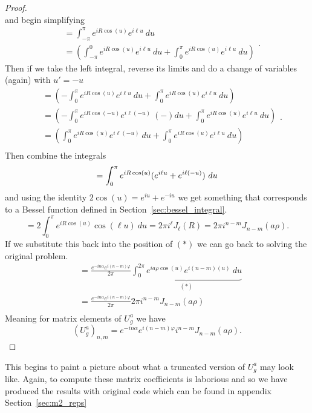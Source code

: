 \documentclass{article}
\begin{document}
\begin{proof}
\[    \]%
    and begin simplifying
    \[%
        \begin{split}
            &= \int^{\pi}_{-\pi} e^{iR\cos\left(u\right)}e^{i\ell u} \ du \\
            &= \left( \int^{0}_{-\pi} e^{iR\cos\left(u\right)}e^{i\ell u} \ du + \int^{\pi}_{0} e^{iR\cos\left(u\right)}e^{i\ell u} \ du \right)
        \end{split} 
    .\]%
    Then if we take the left integral, reverse its limits and do a change of variables (again) with $u' = -u$
    \[%
        \begin{split}
            &= \left( -\int^{\pi}_{0} e^{iR\cos\left(u\right)}e^{i\ell u} \ du + \int^{\pi}_{0} e^{iR\cos\left(u\right)}e^{i\ell u} \ du \right) \\
            &= \left( -\int^{\pi}_{0} e^{iR\cos\left(-u\right)}e^{i\ell(-u)} \ (-)du + \int^{\pi}_{0} e^{iR\cos\left(u\right)}e^{i\ell u} \ du \right) \\
            &=  \left( \int^{\pi}_{0} e^{iR\cos\left(u\right)}e^{i\ell(-u)} \ du + \int^{\pi}_{0} e^{iR\cos\left(u\right)}e^{i\ell u} \ du \right) \\
        \end{split}
    .\]%
    Then combine the integrals
    \[%
        = \int^{\pi}_{0} e^{iR\cos\left(u\right)} (e^{i\ell u} + e^{i\ell(-u)}) \ du  \\
    \]%
    and using the identity $2 \cos\left(u\right) = e^{iu} + e^{-iu}$ we get something that corresponds to a Bessel function defined in Section~\ref{sec:bessel_integral}.
    \[%
        = 2\int^{\pi}_{0} e^{iR\cos\left(u\right)}  \cos\left(\ell u\right) \ du = 2\pi i^{\ell} J_{\ell}(R) = 2\pi i^{n-m} J_{n-m}(a\rho)
    .\]%
    If we substitute this back into the position of $(*)$ we can go back to solving the original problem.
    \[%
        \begin{split}
            &= \frac{e^{-in\alpha} e^{i(n-m)\varphi}}{2\pi} \underbrace{\int^{2\pi}_{0} e^{ia\rho \cos\left(u\right)}e^{i (n-m)(u)} \ du}_{(*)} \\
            & = \frac{e^{-in\alpha} e^{i(n-m)\varphi}}{2\pi} 2\pi i^{n-m} J_{n-m}(a\rho) \\ 
        \end{split}
    \]%
    Meaning for matrix elements of $U^{a}_{g}$ we have
    \[%
            \left(U^{a}_{g}\right)_{n,m} =  e^{-in\alpha} e^{i(n-m)\varphi}i^{n-m}J_{n-m}(a\rho)   
    .\]%
\end{proof}

This begins to paint a picture about what a truncated version of $U^{a}_{g}$ may look like. Again, to compute these matrix coefficients is laborious and so we have produced the results with original code which can be found in appendix Section~\ref{sec:m2_reps}
\end{document}
